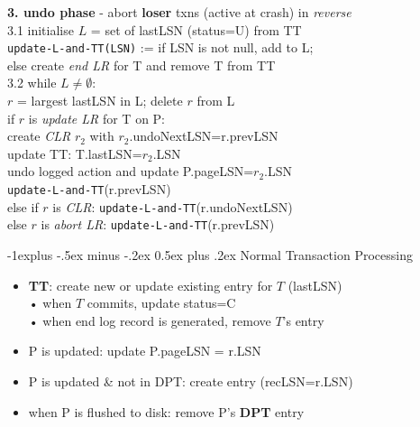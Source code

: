\documentclass[10pt, landscape]{article}
\makeatletter
\renewcommand{\subsection}{\@startsection{subsection}{2}{0mm}%
                                {-1explus -.5ex minus -.2ex}%
                                {0.5ex plus .2ex}%
                                {\normalfont\normalsize\bfseries}}
\makeatother
\begin{document}
\begin{multicols*}{3}
\smallskip
\textbf{3. undo phase} - abort \textbf{loser} txns (active at crash) in \textit{reverse} \\
3.1 initialise $L$ = set of lastLSN (status=U) from TT \\
\hspace{10mm} \texttt{update-L-and-TT(LSN)} := if LSN is not null, add to L; \\
\hspace{10mm} else create \textit{end LR} for T and remove T from TT \\
3.2 while $L \neq \emptyset$: \\
\hspace{10mm} $r$ = largest lastLSN in L; delete $r$ from L \\
\hspace{10mm} if $r$ is \textit{update LR} for T on P: \\
	\hspace{15mm} create \textit{CLR} $r_2$ with $r_2$.undoNextLSN=r.prevLSN \\
	\hspace{15mm} update TT: T.lastLSN=$r_2$.LSN \\
	\hspace{15mm} undo logged action and update P.pageLSN=$r_2$.LSN \\
	\hspace{15mm} \texttt{update-L-and-TT}(r.prevLSN) \\
\hspace{10mm} else if $r$ is \textit{CLR}: \texttt{update-L-and-TT}(r.undoNextLSN) \\
\hspace{10mm} else $r$ is \textit{abort LR}: \texttt{update-L-and-TT}(r.prevLSN) 

\smallskip

\subsection{Normal Transaction Processing}
\begin{itemize}
\item \textbf{TT}: create new or update existing entry for $T$ (lastLSN) \\
\hspace{5mm} • when $T$ commits, update status=C \\
\hspace{5mm} • when end log record is generated, remove $T$'s entry \\
\item P is updated: update P.pageLSN = r.LSN
\item P is updated \& not in DPT: create entry (recLSN=r.LSN)
\item when P is flushed to disk: remove P's \textbf{DPT} entry
\end{itemize}




\end{multicols*}
\end{document}
